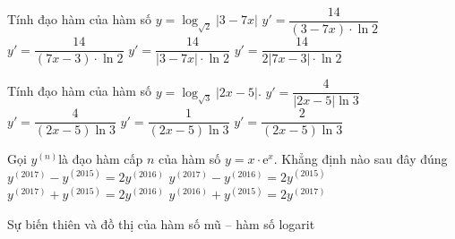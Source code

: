 \begin{ex}%
	Tính đạo hàm của hàm số $y=\log_{\sqrt{2}}|3-7x|$ 
	\choice
	{$y'=\dfrac{14}{(3-7x)\cdot\ln2}$}
	{$y'=\dfrac{14}{(7x-3)\cdot\ln2}$}
	{\True $y'=\dfrac{14}{|3-7x|\cdot\ln2}$}
	{$y'=\dfrac{14}{2|7x-3|\cdot\ln2}$}
\end{ex}
\begin{ex}%
	Tính đạo hàm của hàm số $y=\log_{\sqrt{3}}|2x-5|$. 
	\choice
	{\True $y'=\dfrac{4}{|2 x-5| \ln 3}$}
	{$y'=\dfrac{4}{(2 x-5) \ln 3}$}
	{$y'=\dfrac{1}{(2 x-5) \ln 3}$}
	{$y'=\dfrac{2}{(2 x-5) \ln 3}$}
\end{ex}
\begin{ex}%
	Gọi $y^{(n)}$là đạo hàm cấp $n$ của hàm số $y=x\cdot \mathrm{e}^x$. Khẳng định nào sau đây đúng
	\choice
	{$y^{(2017)}-y^{(2015)}=2 y^{(2016)}$}
	{$y^{(2017)}-y^{(2016)}=2 y^{(2015)}$}
	{\True $y^{(2017)}+y^{(2015)}=2 y^{(2016)}$}
	{$y^{(2016)}+y^{(2015)}=2 y^{(2017)}$}
\end{ex}
\begin{dang}{Sự biến thiên và đồ thị của hàm số mũ – hàm số logarit}
\end{dang}
